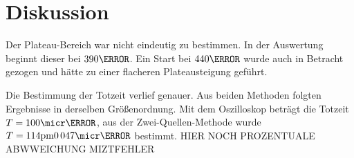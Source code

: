 \section{Diskussion}
\label{sec:Diskussion}
Der Plateau-Bereich war nicht eindeutig zu bestimmen.
In der Auswertung beginnt dieser bei $\si{390}{\volt}$.
Ein Start bei $\si{440}{\volt}$ wurde auch in Betracht gezogen und hätte zu einer flacheren Plateausteigung geführt.

Die Bestimmung der Totzeit verlief genauer.
Aus beiden Methoden folgten Ergebnisse in derselben Größenordnung.
Mit dem Oszilloskop beträgt die Totzeit $T= \si{100}{\micr\second}$, aus der Zwei-Quellen-Methode wurde $T= \si{114 \pm 0.047}{\micr\second}$ bestimmt.
HIER NOCH PROZENTUALE ABWWEICHUNG MIZTFEHLER